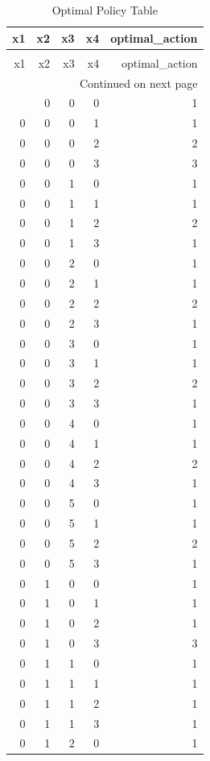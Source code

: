 \begin{longtable}{rrrrr}
\caption{Optimal Policy Table} \label{tab:policy} \\
\toprule
x1 & x2 & x3 & x4 & optimal_action \\
\midrule
\endfirsthead
\caption[]{Optimal Policy Table} \\
\toprule
x1 & x2 & x3 & x4 & optimal_action \\
\midrule
\endhead
\midrule
\multicolumn{5}{r}{Continued on next page} \\
\midrule
\endfoot
\bottomrule
\endlastfoot
0 & 0 & 0 & 0 & 1 \\
0 & 0 & 0 & 1 & 1 \\
0 & 0 & 0 & 2 & 2 \\
0 & 0 & 0 & 3 & 3 \\
0 & 0 & 1 & 0 & 1 \\
0 & 0 & 1 & 1 & 1 \\
0 & 0 & 1 & 2 & 2 \\
0 & 0 & 1 & 3 & 1 \\
0 & 0 & 2 & 0 & 1 \\
0 & 0 & 2 & 1 & 1 \\
0 & 0 & 2 & 2 & 2 \\
0 & 0 & 2 & 3 & 1 \\
0 & 0 & 3 & 0 & 1 \\
0 & 0 & 3 & 1 & 1 \\
0 & 0 & 3 & 2 & 2 \\
0 & 0 & 3 & 3 & 1 \\
0 & 0 & 4 & 0 & 1 \\
0 & 0 & 4 & 1 & 1 \\
0 & 0 & 4 & 2 & 2 \\
0 & 0 & 4 & 3 & 1 \\
0 & 0 & 5 & 0 & 1 \\
0 & 0 & 5 & 1 & 1 \\
0 & 0 & 5 & 2 & 2 \\
0 & 0 & 5 & 3 & 1 \\
0 & 1 & 0 & 0 & 1 \\
0 & 1 & 0 & 1 & 1 \\
0 & 1 & 0 & 2 & 1 \\
0 & 1 & 0 & 3 & 3 \\
0 & 1 & 1 & 0 & 1 \\
0 & 1 & 1 & 1 & 1 \\
0 & 1 & 1 & 2 & 1 \\
0 & 1 & 1 & 3 & 1 \\
0 & 1 & 2 & 0 & 1 \\

\end{longtable}
